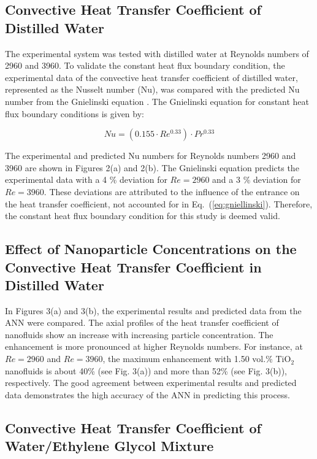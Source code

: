 \documentclass{article}
\begin{document}
\subsection{Convective Heat Transfer Coefficient of Distilled Water}

The experimental system was tested with distilled water at Reynolds numbers of 2960 and 3960. To validate the constant heat flux boundary condition, the experimental data of the convective heat transfer coefficient of distilled water, represented as the Nusselt number (Nu), was compared with the predicted Nu number from the Gnielinski equation \cite{ref9}. The Gnielinski equation for constant heat flux boundary conditions is given by:

\begin{equation}
Nu = \left(0.155 \cdot Re^{0.33}\right) \cdot Pr^{0.33}
\label{eq:gniellinski}
\end{equation}

The experimental and predicted Nu numbers for Reynolds numbers 2960 and 3960 are shown in Figures 2(a) and 2(b). The Gnielinski equation predicts the experimental data with a 4 \% deviation for $Re = 2960$ and a 3 \% deviation for $Re = 3960$. These deviations are attributed to the influence of the entrance on the heat transfer coefficient, not accounted for in Eq.~(\ref{eq:gniellinski}). Therefore, the constant heat flux boundary condition for this study is deemed valid.

\subsection{Effect of Nanoparticle Concentrations on the Convective Heat Transfer Coefficient in Distilled Water}

In Figures 3(a) and 3(b), the experimental results and predicted data from the ANN were compared. The axial profiles of the heat transfer coefficient of nanofluids show an increase with increasing particle concentration. The enhancement is more pronounced at higher Reynolds numbers. For instance, at $Re = 2960$ and $Re = 3960$, the maximum enhancement with 1.50 vol.\% TiO$_2$ nanofluids is about 40\% (see Fig. 3(a)) and more than 52\% (see Fig. 3(b)), respectively. The good agreement between experimental results and predicted data demonstrates the high accuracy of the ANN in predicting this process.

\subsection{Convective Heat Transfer Coefficient of Water/Ethylene Glycol Mixture}
\end{document}
